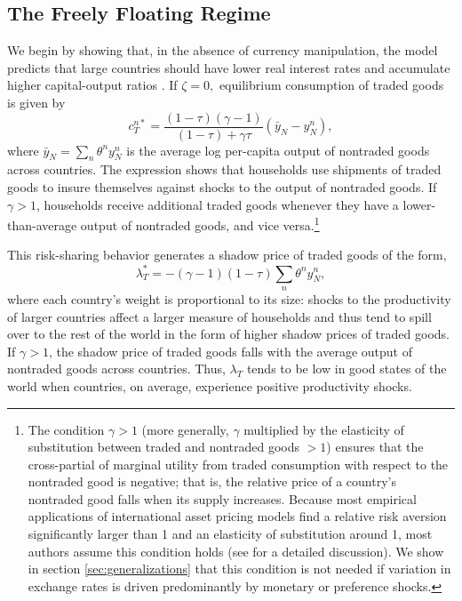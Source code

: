 \documentclass[12pt,letter]{article}
\theoremstyle{break} \theorembodyfont{\normalfont\itshape}
\theoremstyle{break}
\theoremstyle{break} \theorembodyfont{\normalfont\itshape}
\theoremstyle{break} \theorembodyfont{\normalfont\itshape}
\begin{document}
 
\subsection{The Freely Floating Regime}




We begin by showing that, in the absence of currency manipulation, the
model predicts that large countries should have lower real interest
rates \citep{Hassan2013} and accumulate higher capital-output ratios
\citep{HassanMertensZhang2015}. If \(\zeta=0,\) equilibrium
consumption of traded goods is given by
\begin{equation}
  c_{T}^{n \ast} = \frac{(1 - \tau)(\gamma - 1)}{(1 - \tau) + \gamma \tau}
  \left( \bar{y}_N - y_{N}^n \right), 
  \label{eqn:cTpNP}
\end{equation}
where $\bar{y}_N = \sum_{n} \theta^n y_N^n$ is the average log
per-capita output of nontraded goods across countries. The expression
shows that households use shipments of traded goods to insure
themselves against shocks to the output of nontraded goods. If
\(\gamma>1\), households receive additional traded goods whenever they
have a lower-than-average output of nontraded goods, and vice
versa.\footnote{The condition \(\gamma>1\) (more generally, \(\gamma\)
  multiplied by the elasticity of substitution between traded and
  nontraded goods \(>1\)) ensures that the cross-partial of marginal
  utility from traded consumption with respect to the nontraded good
  is negative; that is, the relative price of a country's nontraded
  good falls when its supply increases. Because most empirical
  applications of international asset pricing models find a relative
  risk aversion significantly larger than 1 and an elasticity of
  substitution around 1, most authors assume this condition holds (see
  \citet*{Coeurdacier2009} for a detailed discussion). We show in
  section \ref{sec:generalizations} that this condition is not needed
  if variation in exchange rates is driven predominantly by monetary
  or preference shocks. }


This risk-sharing behavior generates a shadow price of traded goods of
the form, \begin{equation} \lambda_{T}^\ast = -(\gamma - 1)(1 - \tau)
  \sum_{n} \theta^n y_N^n,
  \label{eqn:lambdat2NP}
\end{equation}
where each country's weight is proportional to its size: shocks to the
productivity of larger countries affect a larger measure of households
and thus tend to spill over to the rest of the world in the form of
higher shadow prices of traded goods. If $\gamma > 1$, the shadow
price of traded goods falls with the average output of nontraded goods
across countries. Thus, $\lambda_{T}$ tends to be low in good states
of the world when countries, on average, experience positive
productivity shocks.
\end{document}
